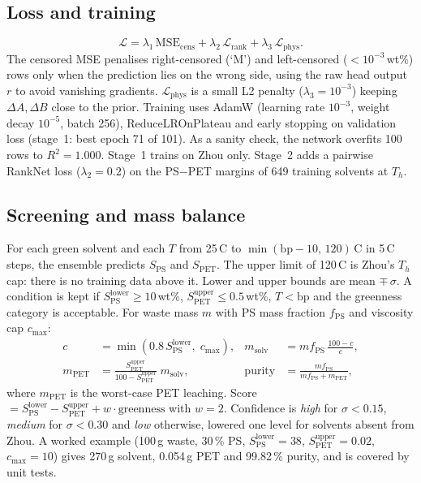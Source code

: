 \documentclass[11pt,a4paper]{article}
\newcommand{\wt}{wt\%}
\begin{document}
\subsection{Loss and training}
\begin{equation}
\mathcal{L} = \lambda_1\,\mathrm{MSE}_{\text{cens}} + \lambda_2\,\mathcal{L}_{\text{rank}} +
\lambda_3\,\mathcal{L}_{\text{phys}}.
\end{equation}
The censored MSE penalises right-censored (`M') and left-censored ($<10^{-3}$\,\wt) rows only when the
prediction lies on the wrong side, using the raw head output $r$ to avoid vanishing gradients.
$\mathcal{L}_{\text{phys}}$ is a small L2 penalty ($\lambda_3=10^{-3}$) keeping $\Delta A,\Delta B$ close
to the prior. Training uses AdamW (learning rate $10^{-3}$, weight decay $10^{-5}$, batch 256), ReduceLROnPlateau and early
stopping on validation loss (stage~1: best epoch 71 of 101). As a sanity check, the network overfits 100
rows to $R^2=1.000$. Stage~1 trains on Zhou only. Stage~2 adds a pairwise RankNet loss ($\lambda_2=0.2$)
on the PS$-$PET margins of 649 training solvents at $T_h$.

\subsection{Screening and mass balance}
For each green solvent and each $T$ from 25\,\textdegree C to $\min(\mathrm{bp}-10,\,120)$\,\textdegree C
in 5\,\textdegree C steps, the ensemble predicts $S_{\mathrm{PS}}$ and $S_{\mathrm{PET}}$. The upper limit
of 120\,\textdegree C is Zhou's $T_h$ cap: there is no training data above it. Lower and upper bounds are
mean $\mp\,\sigma$. A condition is kept if $S^{\text{lower}}_{\mathrm{PS}}\ge 10$\,\wt,
$S^{\text{upper}}_{\mathrm{PET}}\le 0.5$\,\wt, $T<\mathrm{bp}$ and the greenness category is acceptable.
For waste mass $m$ with PS mass fraction $f_{\mathrm{PS}}$ and viscosity cap $c_{\max}$:
\begin{align}
c &= \min\!\left(0.8\,S^{\text{lower}}_{\mathrm{PS}},\; c_{\max}\right), &
m_{\text{solv}} &= m f_{\mathrm{PS}}\,\frac{100-c}{c},\\
m_{\mathrm{PET}} &= \frac{S^{\text{upper}}_{\mathrm{PET}}}{100-S^{\text{upper}}_{\mathrm{PET}}}\;m_{\text{solv}}, &
\text{purity} &= \frac{m f_{\mathrm{PS}}}{m f_{\mathrm{PS}}+m_{\mathrm{PET}}},
\end{align}
where $m_{\mathrm{PET}}$ is the worst-case PET leaching. Score
$=S^{\text{lower}}_{\mathrm{PS}}-S^{\text{upper}}_{\mathrm{PET}}+w\cdot\text{greenness}$ with $w=2$.
Confidence is \emph{high} for $\sigma<0.15$, \emph{medium} for $\sigma<0.30$ and \emph{low} otherwise,
lowered one level for solvents absent from Zhou. A worked example (100\,g waste, 30\,\% PS,
$S^{\text{lower}}_{\mathrm{PS}}=38$, $S^{\text{upper}}_{\mathrm{PET}}=0.02$, $c_{\max}=10$) gives 270\,g
solvent, 0.054\,g PET and 99.82\,\% purity, and is covered by unit tests.
\end{document}
